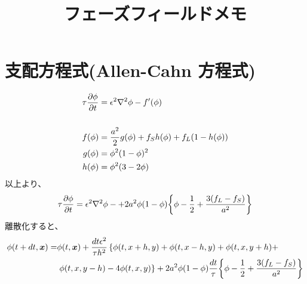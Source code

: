 \documentclass[twocolumn,landscape]{ltjsarticle}
\begin{document}
\title{フェーズフィールドメモ}
\maketitle

\section{支配方程式(Allen-Cahn 方程式)}
  \begin{equation}
    \begin{split}
      \tau\pdv{\phi}{t}&=\epsilon^2\laplacian\phi-f'(\phi)\\
      \\
      f(\phi)&=\frac{a^2}{2}g(\phi)+f_S h(\phi)+f_L(1-h(\phi))\\
      g(\phi)&=\phi^2(1-\phi)^2\\
      h(\phi)&=\phi^2(3-2\phi)
    \end{split}    
  \end{equation}
  以上より、
  \begin{equation}
    \tau\pdv{\phi}{t}=\epsilon^2\laplacian\phi-+2a^2\phi(1-\phi)\qty{\phi-\frac{1}{2}+\frac{3(f_L-f_S)}{a^2}}
  \end{equation}
  離散化すると、
  \begin{equation}
    \begin{split}
      \phi(t+dt,\vb*{x})=&\phi(t,\vb*{x})+\frac{dt \epsilon^2}{\tau h^2}\left\{\phi(t,x+h,y)+\phi(t,x-h,y)+\phi(t,x,y+h)+\right.\\
      &\left.\phi(t,x,y-h)-4\phi(t,x,y)\right\}+2a^2\phi(1-\phi)\frac{dt}{\tau}\qty{\phi-\frac{1}{2}+\frac{3(f_L-f_S)}{a^2}}      
    \end{split}
  \end{equation}
\end{document}
